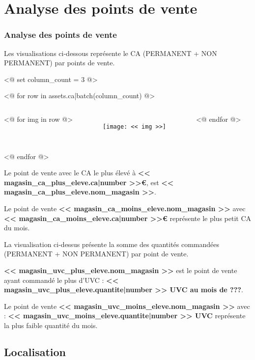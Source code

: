 \documentclass{beamer}
\begin{document}
    \section{Analyse des points de vente}

    \begin{frame}
        \tiny
        \frametitle{Analyse des points de vente}

        Les visualisations ci-dessous représente le CA (PERMANENT + NON PERMANENT) par points de vente.\par

        <@ set column_count = 3  @>

        <@ for row in assets.ca|batch(column_count) @>
            \begin{columns}
                <@ for img in row @>
                        \centering
                        \begin{figure}[h]
                            \centering
                            \texttt{[image: << img >>]}
                        \end{figure}
                <@ endfor @>
            \end{columns}
        <@ endfor @>

        Le point de vente avec le CA le plus élevé à \textbf{<< magasin_ca_plus_eleve.ca|number >>€}, est \textbf{<< magasin_ca_plus_eleve.nom_magasin >>}.\par
        Le point de vente \textbf{<< magasin_ca_moins_eleve.nom_magasin >>} avec \textbf{<< magasin_ca_moins_eleve.ca|number >>€} représente le plus petit CA du mois.\par
        La visualisation ci-dessus présente la somme des quantités commandées (PERMANENT + NON PERMANENT) par point de vente.\par
        \textbf{<< magasin_uvc_plus_eleve.nom_magasin >>} est le point de vente ayant commandé le plus d’UVC : \textbf{<< magasin_uvc_plus_eleve.quantite|number >> UVC au mois de ???}.\par
        Le point de vente \textbf{<< magasin_uvc_moins_eleve.nom_magasin >>} avec : \textbf{<< magasin_uvc_moins_eleve.quantite|number >> UVC} représente la plus faible quantité du mois.\par
    \end{frame}

    \subsection{Localisation}
\end{document}
